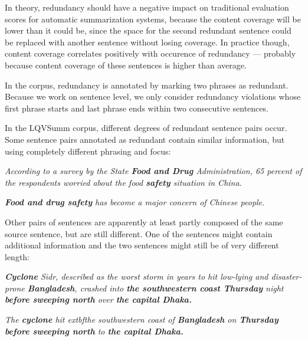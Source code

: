 \documentclass[a4paper,10pt]{scrartcl}
\theoremstyle{style}
\begin{document}

In theory, redundancy should have a negative impact on traditional evaluation scores for automatic summarization systems, because the content coverage will be lower than it could be, since the space for the second redundant sentence could be replaced with another sentence without losing coverage. In practice though, content coverage correlates positively with occurence of redundancy \citep[see][]{friedrichlqvsumm} --- probably because content coverage of these sentences is higher than average.

In the corpus, redundancy is annotated by marking two phrases as redundant. Because we work on sentence level, we only consider redundancy violations whose first phrase starts and last phrase ends within two consecutive sentences.

In the LQVSumm corpus, different degrees of redundant sentence pairs occur.
Some sentence pairs annotated as redundant contain similar information, but using completely different phrasing and focus:

\begin{framed}
\textit{According to a survey by the State \textbf{Food and Drug} Administration, 65 percent of the respondents worried about the food \textbf{safety} situation in China.}

\textit{\textbf{Food and drug safety} has become a major concern of Chinese people.}
\end{framed}

Other pairs of sentences are apparently at least partly composed of the same source sentence, but are still different. One of the sentences might contain additional information and the two sentences might still be of very different length:

\begin{framed}
\textit{\textbf{Cyclone} Sidr, described as the worst storm in years to hit low-lying and disaster-prone \textbf{Bangladesh}, crashed into \textbf{the southwestern coast Thursday} night \textbf{before sweeping north} over \textbf{the capital Dhaka.}}

\textit{The \textbf{cyclone} hit \†extbf{the southwestern coast} of \textbf{Bangladesh} on \textbf{Thursday before sweeping north} to \textbf{the capital Dhaka.}}
\end{framed}
\end{document}
